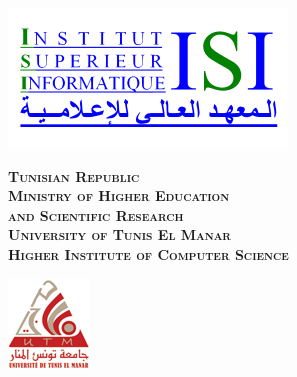 \thispagestyle{empty}%
\hspace{-1cm}
\begin{minipage}[l]{0.2\columnwidth}
\includegraphics[width=1.1\columnwidth]{LogoISI}\\
\end{minipage}
\hfill
\begin{minipage}[l]{0.6\columnwidth}
\centering
\footnotesize
\textbf{\textsc{Tunisian Republic}}\\
\textbf{\textsc{Ministry of Higher Education\\
and Scientific Research}}\\
\textbf{\textsc{University of Tunis El Manar}}\\
\textbf{\textsc{Higher Institute of Computer Science}}
\end{minipage}
\hfill
\begin{minipage}[l]{0.2\columnwidth}
\includegraphics[width=0.7\columnwidth]{logoutm}\\
\end{minipage}
